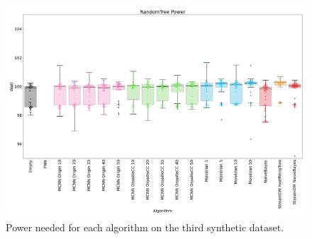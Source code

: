 \begin{figure}[H]
	\includegraphics[width=\linewidth]{figures/results/dataset_3_watt.png}
	\caption{Power needed for each algorithm on the third synthetic dataset.}
\end{figure}

